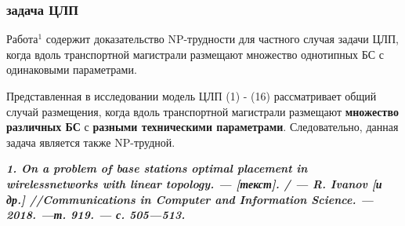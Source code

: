 \begin{frame}
    \frametitle{задача ЦЛП}
    \justifying
    
    Работа$^1$ содержит доказательство NP-трудности для частного случая задачи ЦЛП, когда вдоль транспортной магистрали размещают множество однотипных БС с одинаковыми параметрами. 
    \bigskip
    
    Представленная в исследовании модель ЦЛП (1) - (16) рассматривает общий случай размещения, когда вдоль транспортной магистрали размещают \textbf{множество различных БС} с \textbf{разными техническими параметрами}. Следовательно, данная задача является также NP-трудной.
    \bigskip

    
    \bigskip

    \textit{\textbf{1. On a problem of base stations optimal placement in wirelessnetworks with linear topology. — [текст]. / — R. Ivanov [и др.] //Communications in Computer and Information Science. — 2018. —т. 919. — с. 505—513.}}


\end{frame}

